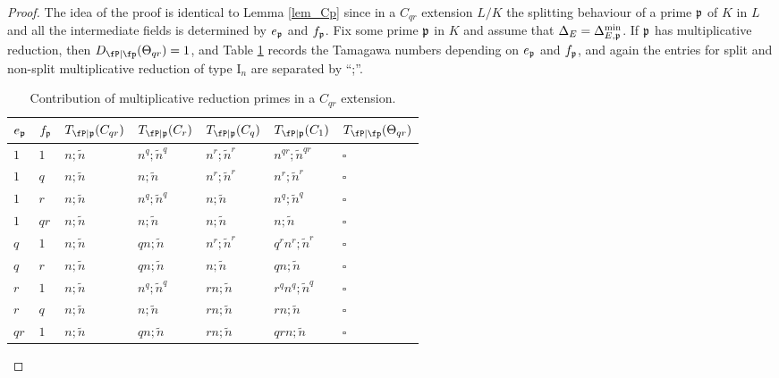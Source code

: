 \begin{proof}
    The idea of the proof is identical to Lemma \ref{lem_Cp} since in a $C_{qr}$ extension $L/K$ the splitting behaviour of a prime $\mathfrak{p}$ of $K$ in $L$ and all the intermediate fields is determined by $e_{\mathfrak{p}}$ and $f_{\mathfrak{p}}$. Fix some prime $\mathfrak{p}$ in $K$ and assume that $\Delta_E=\Delta_{E,\mathfrak{p}}^{\min}$. If $\mathfrak{p}$ has multiplicative reduction, then $\Dp(\Theta_{qr})=1$, and Table \ref{table_Cpq} records the Tamagawa numbers depending on $e_{\mathfrak{p}}$ and $f_{\mathfrak{p}}$, and again the entries for split and non-split multiplicative reduction of type $\mathrm{I}_n$ are separated by ``;''.

    \begin{table}[!ht]
        \centering
        \begin{tabular}{|l|l|l|l|l|l|l|}
        \hline
        $e_{\mathfrak{p}}$ & $f_{\mathfrak{p}}$  & $T_{\fP\mid \pp}(C_{qr})$ & $T_{\fP\mid \pp}(C_r)$ & $T_{\fP\mid \pp}(C_q)$ & $T_{\fP\mid \pp}(C_1)$ & $\Tp(\Theta_{qr})$ \\ \hline
        $1$ & $1$ & $n;\tilde{n}$ & $n^q;\tilde{n}^q$ & $n^r;\tilde{n}^r$ & $n^{qr};\tilde{n}^{qr}$ & $\square$ \\ \hline
        $1$ & $q$ & $n;\tilde{n}$ & $n;\tilde{n}$ & $n^r;\tilde{n}^r$ & $n^r;\tilde{n}^r$ & $\square$ \\ \hline
        $1$ & $r$ & $n;\tilde{n}$ & $n^q;\tilde{n}^q$ & $n;\tilde{n}$ & $n^q;\tilde{n}^q$ & $\square$ \\ \hline
        $1$ & $qr$ & $n;\tilde{n}$ & $n;\tilde{n}$ & $n;\tilde{n}$ & $n;\tilde{n}$ & $\square$ \\ \hline
        $q$ & $1$ & $n;\tilde{n}$ & $qn;\tilde{n}$ & $n^r;\tilde{n}^r$ & $q^rn^r;\tilde{n}^r$ & $\square$ \\ \hline
        $q$ & $r$ & $n;\tilde{n}$ & $qn;\tilde{n}$ & $n;\tilde{n}$ & $qn;\tilde{n}$ & $\square$ \\ \hline
        $r$ & $1$ & $n;\tilde{n}$ & $n^q;\tilde{n}^q$ & $rn;\tilde{n}$ & $r^qn^q;\tilde{n}^q$ & $\square$ \\ \hline
        $r$ & $q$ & $n;\tilde{n}$ & $n;\tilde{n}$ & $rn;\tilde{n}$ & $rn;\tilde{n}$ & $\square$ \\ \hline
        $qr$ & $1$ & $n;\tilde{n}$ & $qn;\tilde{n}$ & $rn;\tilde{n}$ & $qrn;\tilde{n}$ & $\square$ \\ \hline
        \end{tabular}
        \caption{Contribution of multiplicative reduction primes in a $C_{qr}$ extension.}
        \label{table_Cpq}
    \end{table}


\end{proof}
